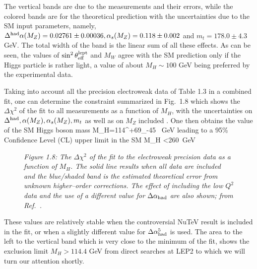 The vertical bands are due to the measurements and their errors,  while
the colored bands are for the theoretical prediction with the uncertainties
due to the SM input parameters, namely, $\Delta^{\rm had} \alpha (M_Z)
= 0.02761 \pm 0.00036, \alpha_s(M_Z)=0.118 \pm 0.002$ and $m_t=178.0 \pm 4.3$ 
GeV. The total width of the band is the linear sum of all these effects. 
As can be seen, the values of $\sin^2 \theta^{\rm lept}_{\rm eff}$ and
$M_W$ agree with the SM prediction only if the Higgs particle is rather 
light, a value of about $M_H \sim 100$ GeV being preferred by the 
experimental data.  \s

Taking into account all the precision electroweak data of Table 1.3 in a 
combined fit, one  can determine the constraint summarized in Fig.~1.8 which 
shows the  $\Delta  \chi^2$ of the fit to all measurements as a function of 
$M_H$, with the uncertainties on $\Delta^{\rm had}, \alpha (M_Z),\alpha_s(M_Z),
m_t$ as well as on $M_Z$ included \cite{High-Precision}. One then obtains  
the value of the SM Higgs boson mass
\beq
M_H=114^{+69}_{-45} ~{\rm GeV}
\eeq
leading to a 95\% Confidence Level (CL) upper limit in the SM
\beq
M_H <260~{\rm GeV}
\label{LEP_Mh_bound}
\eeq
\begin{figure}[htbp]
\begin{center}
\vspace*{-1.9cm}
\hspace*{-1cm}
\end{center}
\vspace{-1.cm}
{\it  Figure 1.8:
The $\Delta \chi^2$ of the fit to the electroweak  precision data as a function
of $M_H$. The solid line results when all data are included and  the blue/shaded
band is the estimated theoretical  error from unknown higher--order
corrections.  The effect of including the low $Q^2$ data and the use of a
different value for $\Delta  \alpha_{\rm had}$ are also shown; 
from Ref.~\cite{High-Precision}.}
\vspace*{-.1cm}
\end{figure} 

These values are relatively stable when the controversial NuTeV result is 
included in the fit, or when a slightly different value for $\Delta 
\alpha_{\rm had}^5$ is used. The area to the left to the vertical band 
which is very close to the minimum of the fit, shows the exclusion  limit 
$M_H >114.4$ GeV from direct searches at LEP2 to which we will turn our 
attention shortly. \s

